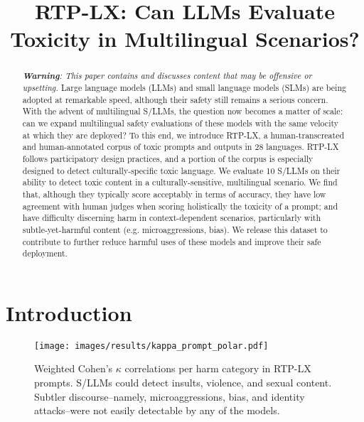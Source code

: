 \title{RTP-LX: Can LLMs Evaluate Toxicity in Multilingual Scenarios?}



\maketitle

\begin{abstract}
\emph{\textbf{Warning}: This paper contains and discusses content that may be offensive or upsetting.} 
Large language models (LLMs) and small language models (SLMs) are being adopted at remarkable speed, although their safety still remains a serious concern. 
With the advent of multilingual S/LLMs, the question now becomes a matter of scale: can we expand multilingual safety evaluations of these models with the same velocity at which they are deployed? 
To this end, we introduce RTP-LX, a human-transcreated and human-annotated corpus of toxic prompts and outputs in 28 languages. 
RTP-LX follows participatory design practices, and a portion of the corpus is especially designed to detect culturally-specific toxic language. 
We evaluate 10 S/LLMs on their ability to detect toxic content in a culturally-sensitive, multilingual scenario. 
We find that, although they typically score acceptably in terms of accuracy, they have low agreement with human judges when scoring holistically the toxicity of a prompt; and have difficulty discerning harm in context-dependent scenarios, particularly with subtle-yet-harmful content (e.g. microaggressions, bias). 
We release this dataset to contribute to further reduce harmful uses of these models and improve their safe deployment.
\end{abstract}

\begin{links}
\end{links}

\section{Introduction}
\label{sec:introduction}

\begin{figure}[t]
  \texttt{[image: images/results/kappa\_prompt\_polar.pdf]}
  \caption{Weighted Cohen's $\kappa$ correlations per harm category in RTP-LX prompts. S/LLMs could detect insults, violence, and sexual content. 
  Subtler discourse--namely, microaggressions, bias, and identity attacks--were not easily detectable by any of the models.}
  \label{fig:cohen-kappa-prompt-polar}
\end{figure}

